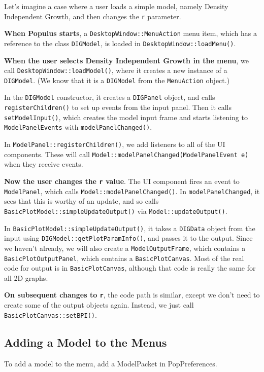 \documentclass[12pt]{article}
\begin{document}
Let's imagine a case where a user loads a simple model, namely Density Independent Growth, and then changes the \texttt{r} parameter.

\textbf{When Populus starts}, a \texttt{DesktopWindow::MenuAction} menu item, which has a reference to the class \texttt{DIGModel}, is loaded in \texttt{DesktopWindow::loadMenu()}.

\textbf{When the user selects Density Independent Growth in the menu}, we call \texttt{DesktopWindow::loadModel()}, where it creates a new instance of a \texttt{DIGModel}.  (We know that it is a \texttt{DIGModel} from the \texttt{MenuAction} object.)

In the \texttt{DIGModel} constructor, it creates a \texttt{DIGPanel} object, and calls \texttt{registerChildren()} to set up events from the input panel.  Then it calls \texttt{setModelInput()}, which creates the model input frame and starts listening to \texttt{ModelPanelEvents} with \texttt{modelPanelChanged()}.

In \texttt{ModelPanel::registerChildren()}, we add listeners to all of the UI components.  These will call \texttt{Model::modelPanelChanged(ModelPanelEvent e)} when they receive events.

\textbf{Now the user changes the \texttt{r} value}.  The UI component fires an event to \texttt{ModelPanel}, which calls \texttt{Model::modelPanelChanged()}. In \texttt{modelPanelChanged}, it sees that this is worthy of an update, and so calls \texttt{BasicPlotModel::simpleUpdateOutput()} via \texttt{Model::updateOutput()}.

In \texttt{BasicPlotModel::simpleUpdateOutput()}, it takes a \texttt{DIGData} object from the input using \texttt{DIGModel::getPlotParamInfo()}, and passes it to the output.  Since we haven't already, we will also create a \texttt{ModelOutputFrame}, which contains a \texttt{BasicPlotOutputPanel}, which contains a \texttt{BasicPlotCanvas}.  Most of the real code for output is in \texttt{BasicPlotCanvas}, although that code is really the same for all 2D graphs.

\textbf{On subsequent changes to \texttt{r}}, the code path is similar, except we don't need to create some of the output objects again.  Instead, we just call \texttt{BasicPlotCanvas::setBPI()}.


\subsection{Adding a Model to the Menus}
To add a model to the menu, add a ModelPacket in PopPreferences.
\end{document}
